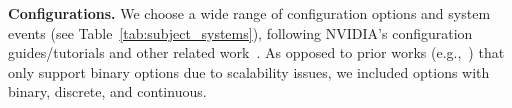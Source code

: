 


\noindent\textbf{Configurations.} We choose a wide range of configuration options and system events (see Table~\ref{tab:subject_systems}), following \textsc{NVIDIA}'s configuration guides/tutorials and other related work~\cite{Halawa2017}. As opposed to prior works (e.g.,~\cite{velez2021white,VJSSAK:ASE20}) that only support binary options due to scalability issues, we included options with binary, discrete, and continuous.


